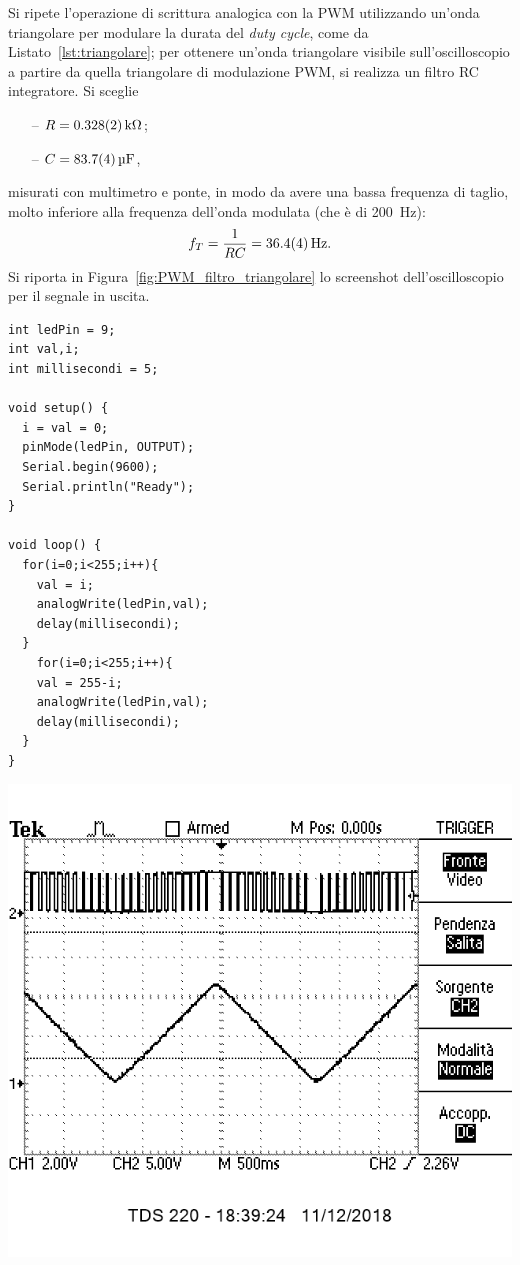 \documentclass[10pt,oneside,a4paper]{article}
\newenvironment{Figure}
  {\par\medskip\noindent\minipage{\linewidth}}
  {\endminipage\par\medskip}
\begin{document}
\begin{multicols}{2}
Si ripete l'operazione di scrittura analogica con la PWM utilizzando un'onda triangolare per modulare la durata del \emph{duty cycle}, come da Listato~\ref{lst:triangolare}; per ottenere un'onda triangolare visibile sull'oscilloscopio a partire da quella triangolare di modulazione PWM, si realizza un filtro RC integratore. Si sceglie
\begin{itemize}
\item[--] $R = \SI{0.328 \pm 0.002}{\kilo\ohm}$;
\item[--] $C = \SI{83.7 \pm 0.4}{\micro\farad}$,
\end{itemize}
misurati con multimetro e ponte, in modo da avere una bassa frequenza di taglio, molto inferiore alla frequenza dell'onda modulata (che è di \SI{200}{Hz}):
\[
f_T = \frac{1}{RC} = \SI{36.4 \pm 0.4}{\Hz}.
\] 
Si riporta in Figura~\ref{fig:PWM_filtro_triangolare} lo screenshot dell'oscilloscopio per il segnale in uscita.

\begin{lstlisting}[style=CStyle, caption={Codice per la scrittura PWM, modulazione triangolare}, label=lst:triangolare]
int ledPin = 9;
int val,i;
int millisecondi = 5;

void setup() {
  i = val = 0;
  pinMode(ledPin, OUTPUT);
  Serial.begin(9600);
  Serial.println("Ready");
}

void loop() {
  for(i=0;i<255;i++){
    val = i;
    analogWrite(ledPin,val);
    delay(millisecondi);    
  }
    for(i=0;i<255;i++){
    val = 255-i;
    analogWrite(ledPin,val);
    delay(millisecondi); 
  }
}
\end{lstlisting}

\begin{Figure}
	\begin{center}
	\includegraphics[width=0.9\linewidth]{triangolare2.png}
	\label{fig:PWM_filtro_triangolare}
	\end{center}
\end{Figure}


\end{multicols}
\end{document}
